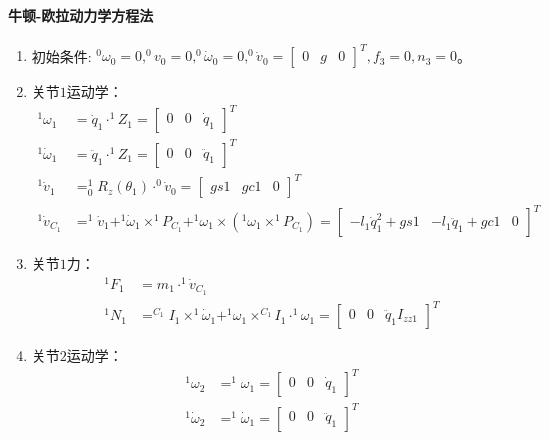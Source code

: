 \documentclass[
12pt, %
a4paper, 
oneside, %
headinclude,footinclude, %
]{scrartcl}
\begin{document}
{\paragraph{牛顿-欧拉动力学方程法}
\begin{enumerate}
\item 初始条件: $ ^0\omega_0 = 0, ^0v_0 = 0, ^0\dot{\omega}_0 = 0, ^0\dot{v}_0 = \begin{bmatrix} 0 & g & 0 \end{bmatrix}^T, f_3 = 0, n_3 = 0 $。
\item 关节$ 1 $运动学：
\begin{align*}
^1\omega_1 &= \dot{q}_1 \cdot ^1Z_1 = \begin{bmatrix} 0 & 0 & \dot{q}_1 \end{bmatrix}^T \\
^1\dot{\omega}_1 &= \ddot{q}_1 \cdot ^1Z_1 = \begin{bmatrix} 0 & 0 & \ddot{q}_1 \end{bmatrix}^T \\
^1\dot{v}_1 &= ^1_0R_z(\theta_1) \cdot ^0\dot{v}_0 = \begin{bmatrix} gs1 & gc1 & 0 \end{bmatrix}^T \\
^1\dot{v}_{C_1} &= ^1\dot{v}_1 + ^1\dot{\omega}_1 \times ^1P_{C_1} + ^1\omega_1 \times (^1\omega_1 \times ^1P_{C_1}) = \begin{bmatrix} -l_1\dot{q}_1^2 + gs1 & -l_1\ddot{q}_1 + gc1 & 0 \end{bmatrix}^T
\end{align*}
\item 关节$ 1 $力：
\begin{align*}
^1F_1 &= m_1 \cdot ^1\dot{v}_{C_1} \\
^1N_1 &= ^{C_1}I_1 \times ^1\dot{\omega}_1 + ^1\omega_1 \times ^{C_1}I_1 \cdot ^1\omega_1 = \begin{bmatrix} 0 & 0 & \ddot{q}_1 I_{zz1} \end{bmatrix}^T
\end{align*}
\item 关节$ 2 $运动学：
\begin{align*}
^1\omega_2 &= ^1\omega_1 = \begin{bmatrix} 0 & 0 & \dot{q}_1 \end{bmatrix}^T \\
^1\dot{\omega}_2 &= ^1\dot{\omega}_1 = \begin{bmatrix} 0 & 0 & \ddot{q}_1 \end{bmatrix}^T \\

\end{align*}
\end{enumerate}}
\end{document}

